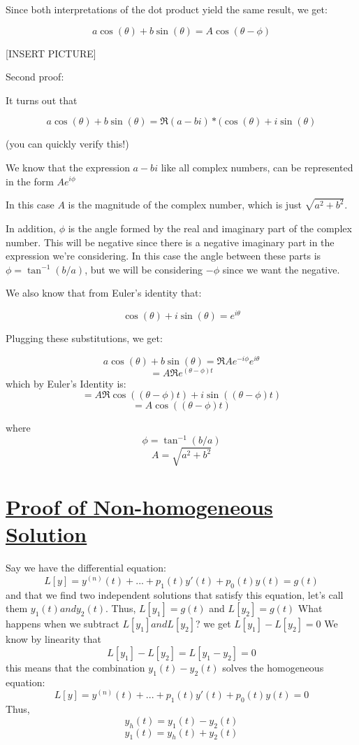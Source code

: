 \documentclass{report}
\begin{document}
Since both interpretations of the dot product yield the same result, we get:

$$a\cos(\theta) + b\sin(\theta) = A\cos(\theta - \phi)$$

[INSERT PICTURE]

Second proof:

It turns out that

$$a\cos(\theta) + b\sin(\theta) = \Re{(a-bi)*(\cos(\theta) + i\sin(\theta)}$$

(you can quickly verify this!)

We know that the expression $a-bi$ like all complex numbers, can be represented in the form $Ae^{i\phi}$

In this case $A$ is the magnitude of the complex number, which is just $\sqrt{a^2+b^2}$.

In addition, $\phi$ is the angle formed by the real and imaginary part of the complex number. This will be negative since there is a negative imaginary part in the expression we're considering. In this case the angle between these parts is $\phi = \tan^{-1}(b/a)$, but we will be considering $-\phi$ since we want the negative.

We also know that from Euler's identity that:

$$\cos(\theta) + i\sin(\theta) = e^{i\theta}$$

Plugging these substitutions, we get:

$$a\cos(\theta) + b\sin(\theta) = \Re{Ae^{-i\phi}e^{i\theta}}$$
$$=A\Re{e^{(\theta-\phi)t}}$$
which by Euler's Identity is:
$$=A\Re{\cos((\theta-\phi)t)+i\sin((\theta-\phi)t)}$$
$$=A\cos((\theta-\phi)t)$$

where 
$$\phi = \tan^{-1}(b/a)$$
$$A = \sqrt{a^2+b^2}$$




\section{\hyperref[th:nhSol]{Proof of Non-homogeneous Solution}}
\label{sec:prNhSol}
Say we have the differential equation:
 $$L[y] = y^{(n)}(t) + ... + p_1(t)y'(t) + p_0(t)y(t) = g(t)$$
and that we find two independent solutions that satisfy this equation, let's call them $y_1(t) and y_2(t)$.
Thus, $L[y_1]=g(t)$ and $L[y_2]=g(t)$
What happens when we subtract $L[y_1] and L[y_2]$?
we get $L[y_1]-L[y_2] = 0$
We know by linearity that 
$$L[y_1]-L[y_2] = L[y_1-y_2] = 0$$
this means that the combination $y_1(t)-y_2(t)$ solves the homogeneous equation:
$$L[y] = y^{(n)}(t) + ... + p_1(t)y'(t) + p_0(t)y(t) = 0$$
Thus,
$$y_h(t) = y_1(t)-y_2(t)$$
$$y_1(t) = y_h(t) + y_2(t)$$
\end{document}

